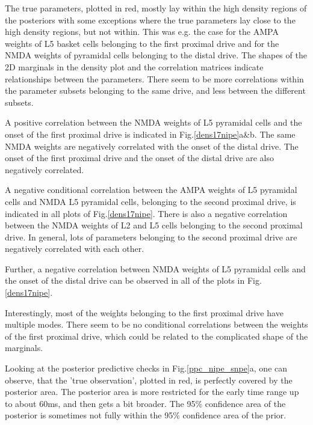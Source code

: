 \documentclass[12pt]{extreport}
\begin{document}
The true parameters, plotted in red, mostly lay within the high density regions of the posteriors with some exceptions where the true parameters lay close to the high density regions, but not within. This was e.g. the case for the AMPA weights of L5 basket cells belonging to the first proximal drive and for the NMDA weights of pyramidal cells belonging to the distal drive. The shapes of the 2D marginals in the density plot and the correlation matrices indicate relationships between the parameters. There seem to be more correlations within the parameter subsets belonging to the same drive, and less between the different subsets. 

A positive correlation between the NMDA weights of L5 pyramidal cells and the onset of the first proximal drive is indicated in Fig.\ref{dens17nipe}a\&b. The same NMDA weights are negatively correlated with the onset of the distal drive. The onset of the first proximal drive and the onset of the distal drive are also negatively correlated.

A negative conditional correlation between the AMPA weights of L5 pyramidal cells and NMDA L5 pyramidal cells, belonging to the second proximal drive, is indicated in all plots of Fig.\ref{dens17nipe}. There is also a negative correlation between the NMDA weights of L2 and L5 cells belonging to the second proximal drive. In general, lots of parameters belonging to the second proximal drive are negatively correlated with each other.

Further, a negative correlation between NMDA weights of L5 pyramidal cells and the onset of the distal drive can be observed in all of the plots in Fig.\ref{dens17nipe}.

Interestingly, most of the weights belonging to the first proximal drive have multiple modes. There seem to be no conditional correlations between the weights of the first proximal drive, which could be related to the complicated shape of the marginals.

Looking at the posterior predictive checks in Fig.\ref{ppc_nipe_snpe}a, one can observe, that the 'true observation', plotted in red, is perfectly covered by the posterior area. The posterior area is more restricted for the early time range up to about 60ms, and then gets a bit broader. The 95\% confidence area of the posterior is sometimes not fully within the 95\% confidence area of the prior. \\
\end{document}
